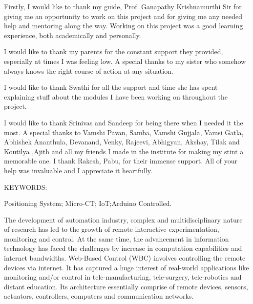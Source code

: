 \documentclass[MTech]{iitmdiss}
\begin{document}
\acknowledgements

Firstly, I would like to thank my guide, Prof. Ganapathy Krishnamurthi Sir for giving me an opportunity to work on this project and for giving me any needed help and mentoring
along the way. Working on this project was a good learning experience, both
academically and personally.


I would like to thank my parents for the constant support they provided, especially at times I was feeling low.
A special thanks to my sister who somehow always knows the right course of action at any situation.

I would like to thank Swathi for all the support and time she has spent explaining stuff about the modules I have been working on throughout the project.

I would like to thank Srinivas and Sandeep for being there when I needed it
the most. A special thanks to Vamshi Pavan, Samba, Vamshi Gujjala, Vamsi Gatla, Abhishek Ananthula, Devanand, Venky, Rajeevi, Abhigyan, Akshay, Tilak and Koutilya ,Ajith and all my friends I made in the institute for making my stint a memorable one. I thank Rakesh, Pabu, for their immense support. All of your help was invaluable and I appreciate it heartfully.




\abstract

\noindent KEYWORDS: \hspace*{0.5em} \parbox[t]{4.4in}{ Positioning System; Micro-CT; IoT;Arduino Controlled.}

\vspace*{24pt}

\noindent The development of automation industry, complex and multidisciplinary nature of research has led to the growth of remote interactive experimentation, monitoring and control. At the same time, the advancement in information technology has faced the challenges by increase in computation capabilities and internet bandwidths. 
Web-Based Control (WBC) involves controlling the remote devices via internet. It has captured a huge interest of real-world applications like monitoring and/or control in tele-manufacturing, tele-surgery, tele-robotics and distant education. Its architecture essentially comprise of remote devices, sensors, actuators, controllers, computers and communication networks. 
\end{document}
